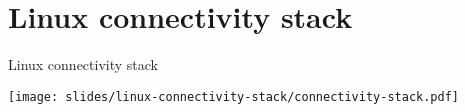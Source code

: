 \section{Linux connectivity stack}

\begin{frame}{Linux connectivity stack}
  \begin{center}
    \texttt{[image: slides/linux-connectivity-stack/connectivity-stack.pdf]}
  \end{center}
\end{frame}
